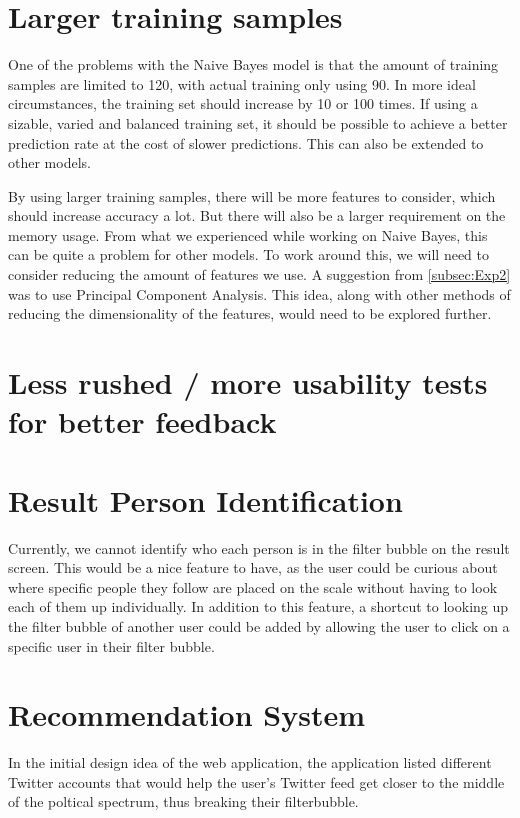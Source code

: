 \section*{Larger training samples}
One of the problems with the Naive Bayes model is that the amount of training
samples are limited to 120, with actual training only using 90. In more ideal
circumstances, the training set should increase by 10 or 100 times. If using a
sizable, varied and balanced training set, it should be possible to achieve a
better prediction rate at the cost of slower predictions. This can also be
extended to other models.\nl

By using larger training samples, there will be more features to consider, which
should increase accuracy a lot. But there will also be a larger requirement on
the memory usage. From what we experienced while working on Naive
Bayes, this can be quite a problem for other models. To work around
this, we will need to consider reducing the amount of features we use. A
suggestion from \autoref{subsec:Exp2} was to use Principal Component Analysis.
This idea, along with other methods of reducing the dimensionality of the
features, would need to be explored further.

\section*{Less rushed / more usability tests for better feedback}

\section*{Result Person Identification}
Currently, we cannot identify who each person is in the filter bubble on the
result screen. This would be a nice feature to have, as the user could be
curious about where specific people they follow are placed on the scale without
having to look each of them up individually. In addition to this feature, a
shortcut to looking up the filter bubble of another user could be added by
allowing the user to click on a specific user in their filter bubble.



\section{Recommendation System}
In the initial design idea of the web application, the application listed
different Twitter accounts that would help the user's Twitter feed get closer to
the middle of the poltical spectrum, thus breaking their filterbubble. \nl

